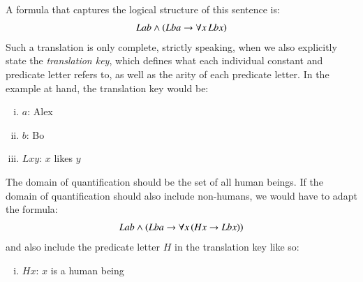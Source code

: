 \documentclass[nobib,nofonts]{tufte-handout}
\begin{document}
A formula that captures the logical structure of this sentence is:
\begin{align*}
  Lab \wedge (Lba \rightarrow \forall x \thinspace Lbx)
\end{align*}
Such a translation is only complete, strictly speaking, when we also explicitly state the \emph{translation key}, which defines what each individual constant and predicate letter refers to, as well as the arity of each predicate letter.
In the example at hand, the translation key would be:
\begin{enumerate}[(i)]
  \item $a$: Alex
  \item $b$: Bo
  \item $Lxy$: $x$ likes $y$
\end{enumerate}
The domain of quantification should be the set of all human beings.
If the domain of quantification should also include non-humans, we would have to adapt the formula:
\begin{align*}
  Lab \wedge (Lba \rightarrow \forall x \thinspace (Hx \rightarrow Lbx))
\end{align*}
and also include the predicate letter $H$ in the translation key like so:
\begin{enumerate}[(iv)]
  \item $Hx$: $x$ is a human being
\end{enumerate}
\end{document}
